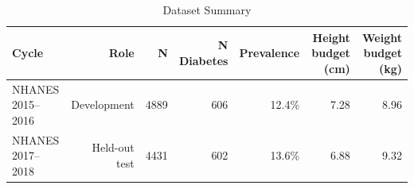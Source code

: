 \begin{table}[htbp]
  \centering
  \caption{Dataset Summary}
  \label{tab:dataset}
  \small
  \begin{tabular}{lrrrrrr}
    \toprule
    Cycle & Role & N & N Diabetes & Prevalence & Height budget (cm) & Weight budget (kg) \\
    \midrule
    NHANES 2015--2016 & Development & 4889 & 606 & 12.4\% & 7.28 & 8.96 \\
    NHANES 2017--2018 & Held-out test & 4431 & 602 & 13.6\% & 6.88 & 9.32 \\
    \bottomrule
  \end{tabular}
\end{table}
